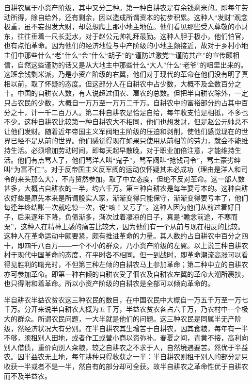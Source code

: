 自耕农属于小资产阶级，其中又分三种。第一种自耕农是有余钱剩米的。即每年劳动所得，除自给外，还有剩余，因以造成所谓资本的初步积累。这种人“发财”观念极重，虽不妄想发大财，却总想爬上那小地主地位。他们看见那些受人尊敬的小财东，往往垂着一尺长涎水，对于赵公元帅礼拜最勤。这种人胆于极小，他们怕官，也有点怕革命。因为他们的经济地位与中产阶级的小地主颇接近，故对于乡村小地主们中那些什么“老”什么“会”什么“胡子”的“谨防过激党”“谨防共产”的宣传颇相信，自然这些谨防的话又是从大地主中那些什么“大人”什么“老爷”的咀里出来的。这班余钱剩米派，乃是小资产阶级的右翼，他们对于现代的革命在他们没有明了真相以前，取了怀疑的态度。但这部分人在自耕农中占少数，大概不及全数百分之十。中国的自耕农人数，有人说超过佃农、雇农的总数。但把半自耕农除外，一定只占农民的少数，大概自一万万至一万万二千万。自耕农中的富裕部分约占其中百分之十，计一千二百万人。第二种自耕农是恰足自给，每年收支怕是相抵，不多也不少。这种自耕农比较第一种自耕农大不相同，他们也想发财，但是赵公元帅总不让他们发财。随着近年帝国主义军阀地主阶级的压迫和剥削，使他们感觉现在的世界已经不是从前的世界。他们感觉得现在如果只使用从前相等的劳力，就会不能维持生活。必须增加劳动时间，即每天起早散晚，对于职业加倍注意，才能维持生活。他们有点骂人了，他们骂洋人叫“鬼子”，骂军阀叫“抢钱司令”，骂土豪劣绅叫“为富不仁”。对于反帝国主义反军阀的运动仅怀疑其未必成功（理由是洋人和司令的来头那么大），不肯贸然参加，取了中立态度，但绝不反对革命。这一部人数甚多，大概占自耕农的一半，约六千万。第三种自耕农是每年要亏本的。这种自耕农好些是原先本来是所谓殷实人家，渐渐变得只能保守，渐渐变得要亏本了，他们每逢年终结账一次就吃惊一次，说“咳！又亏了”。这种人因为他们从前过着好日子，后来逐年下降，负债渐多，渐次过着凄凉的日子，真是“瞻念前途，不寒而栗”，这种人在精神上感的痛苦比较大，因为他们有一个从前与现在相反的比较。这种人在革命运动中颇要紧，颇有推进革命的力量。其人数约占自耕农中百分之四十，即四千八百万――一个不小的群众，乃小资产阶级的左翼。以上说三种自耕农村于现代中国革命的态度，在平时各不相同。但一到战时，即革命潮流高涨可以看得见胜利的曙光时，不但第三种左倾的自耕农马上参加革命；第二种中立的自耕农亦可参加革命。即第一种右倾的自耕农受了佃农及自耕农左翼的革命大潮所裹挟，也只得附和着革命。所以小资产阶级的自耕农是全部可以倾向革命的。


半自耕农半益农贫农这三种农民的数目，在中国农民中大概自一万五千万至一万七千万。分开来说半自耕农大概为五千万，半益农贫农各占六千万，乃农村中一个极大的群众。所谓农民问题，一大半就是他们的问题。这三种农民是同属半无产阶级，然经济状况大有分别。在半自耕农其生增苦于自耕农，因其食粮，每年有一半不够，须租别人田地，或者作工或营小商以资弥补。春夏之间，青黄不接，高利向别人借债，重价向别人籴粮，较之自耕农之不求于人，自然境遇要苦。然优于半益农。因半益农无土地，每年耕种只得收获之一半：半自耕农则租于别人的部分是只收获一半或者不是一半，然自有的部分却可全获。故半自耕农之革命性优于自耕农而不及半益农。

